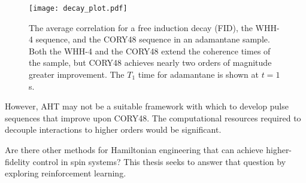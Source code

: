 \begin{figure}[H]
    \centering
    \texttt{[image: decay\_plot.pdf]}
    \caption{The average correlation for a free induction decay (FID), the WHH-4 sequence, and the CORY48 sequence in an adamantane sample. Both the WHH-4 and the CORY48 extend the coherence times of the sample, but CORY48 achieves nearly two orders of magnitude greater improvement. The $T_1$ time for adamantane is shown at $t=1$s.}
    \label{fig:decay_plot_AHT}
\end{figure}

However, AHT may not be a suitable framework with which to develop pulse sequences that improve upon CORY48. The computational resources required to decouple interactions to higher orders would be significant.

Are there other methods for Hamiltonian engineering that can achieve higher-fidelity control in spin systems? This thesis seeks to answer that question by exploring reinforcement learning.
